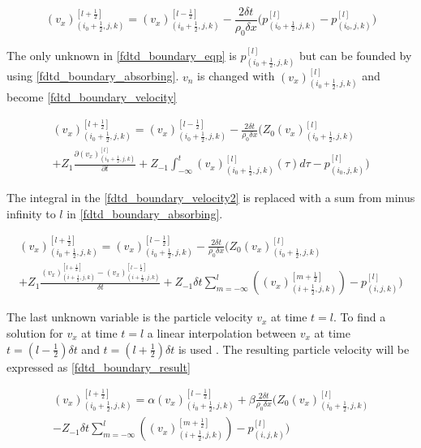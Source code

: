 \begin{equation}\label{fdtd_boundary_eqp}
(v_x)_{(i_0+\frac{1}{2},j,k)}^{[l+\frac{1}{2}]}= (v_x)_{(i_0+\frac{1}{2},j,k)}^{[l-\frac{1}{2}]}-\frac{2 \delta t}{\rho_0 \delta x} \Biggl( 
p_{(i_0+\frac{1}{2},j,k)}^{[l]} -p_{(i_0,j,k)}^{[l]}  \Biggr)
\end{equation}

The only unknown in \autoref{fdtd_boundary_eqp} is $p_{(i_0+\frac{1}{2},j,k)}^{[l]}$ but can be founded by using \autoref{fdtd_boundary_absorbing}. $v_n$ is changed with $(v_x)_{(i_0+\frac{1}{2},j,k)}^{[l]}$ and become \autoref{fdtd_boundary_velocity}


\begin{multline}\label{fdtd_boundary_velocity}
(v_x)_{(i_0+\frac{1}{2},j,k)}^{[l+\frac{1}{2}]}= (v_x)_{(i_0+\frac{1}{2},j,k)}^{[l-\frac{1}{2}]}-\frac{2 \delta t}{\rho_0 \delta x} \Biggl( 
 Z_0(v_x)_{(i_0+\frac{1}{2},j,k)}^{[l]} \\
 +Z_1 \frac{\partial (v_x)_{(i_0+\frac{1}{2},j,k)}^{[l]}}{\partial t} +Z_{-1} \int_{-\infty}^{t} (v_x)_{(i_0+\frac{1}{2},j,k)}^{[l]}(\tau)d\tau -p_{(i_0,j,k)}^{[l]}
\Biggr)
\end{multline}

The integral in the \autoref{fdtd_boundary_velocity2} is replaced with a sum from minus infinity to $l$ in \autoref{fdtd_boundary_absorbing}.

\begin{multline}\label{fdtd_boundary_velocity2}
(v_x)_{(i_0+\frac{1}{2},j,k)}^{[l+\frac{1}{2}]}= (v_x)_{(i_0+\frac{1}{2},j,k)}^{[l-\frac{1}{2}]}-\frac{2 \delta t}{\rho_0 \delta x} \Biggl( 
 Z_0(v_x)_{(i_0+\frac{1}{2},j,k)}^{[l]} \\
+Z_1\frac{(v_x)_{(i+\frac{1}{2},j,k)}^{[l+\frac{1}{2}]}-(v_x)_{(i+\frac{1}{2},j,k)}^{[l-\frac{1}{2}]}}{\delta t}+Z_{-1} \delta t \sum_{m=-\infty}^{l} \left( (v_x)_{(i+\frac{1}{2},j,k)}^{[m+\frac{1}{2}]} \right) -p_{(i,j,k)}^{[l]}
\Biggr)
\end{multline}

The last unknown variable is the particle velocity $v_x$ at time $t=l$. To find a solution for $v_x$ at time  $t=l$  a linear interpolation between $v_x$ at time $t=(l-\frac{1}{2}) \delta t$ and $t=(l+\frac{1}{2}) \delta t$ is used \citep{finiteproblems}. The resulting particle velocity will be expressed as \autoref{fdtd_boundary_result}

\begin{multline}\label{fdtd_boundary_result}
(v_x)_{(i_0+\frac{1}{2},j,k)}^{[l+\frac{1}{2}]}= \alpha (v_x)_{(i_0+\frac{1}{2},j,k)}^{[l-\frac{1}{2}]} + \beta \frac{2 \delta t}{\rho_0 \delta x} \Biggl( 
 Z_0(v_x)_{(i_0+\frac{1}{2},j,k)}^{[l]} \\
-Z_{-1} \delta t \sum_{m=-\infty}^{l} \left( (v_x)_{(i+\frac{1}{2},j,k)}^{[m+\frac{1}{2}]} \right) -p_{(i,j,k)}^{[l]}
\Biggr)
\end{multline}


